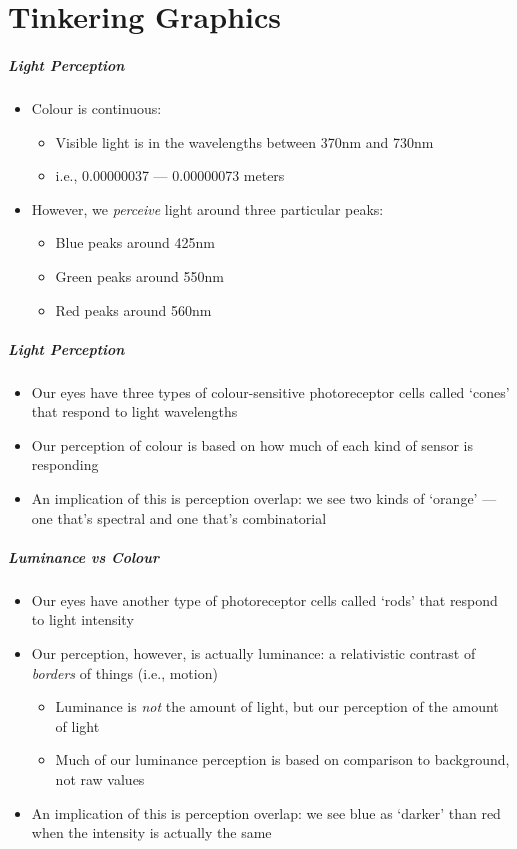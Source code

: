 \part{Tinkering Graphics}
\frame{\partpage}

\begin{frame}
	\frametitle{Light Perception}
	\begin{itemize}
		\item Colour is continuous:
		\begin{itemize}
			\item Visible light is in the wavelengths between 370nm and 730nm
			\item i.e., 0.00000037 --- 0.00000073 meters
		\end{itemize}
		\item However, we \textit{perceive} light around three particular peaks:
		\begin{itemize}
			\item Blue peaks around 425nm
			\item Green peaks around 550nm
			\item Red peaks around 560nm
		\end{itemize}
	\end{itemize}
\end{frame}

\begin{frame}
	\frametitle{Light Perception}
	\begin{itemize}
		\item Our eyes have three types of colour-sensitive photoreceptor cells called `cones' that respond to light wavelengths
		\item Our perception of colour is based on how much of each kind of sensor is responding
		\item An implication of this is perception overlap: we see two kinds of `orange' --- one that's spectral and one that's combinatorial
	\end{itemize}
\end{frame}


\begin{frame}
	\frametitle{Luminance vs Colour}
	\begin{itemize}
		\item Our eyes have another type of photoreceptor cells called `rods' that respond to light intensity
		\item Our perception, however, is actually luminance: a relativistic contrast of \textit{borders} of things (i.e., motion) 
		\begin{itemize}
			\item Luminance is \textit{not} the amount of light, but our perception of the amount of light
			\item Much of our luminance perception is based on comparison to background, not raw values
		\end{itemize}
		\item An implication of this is perception overlap: we see blue as `darker' than red when the intensity is actually the same
	\end{itemize}
\end{frame}

